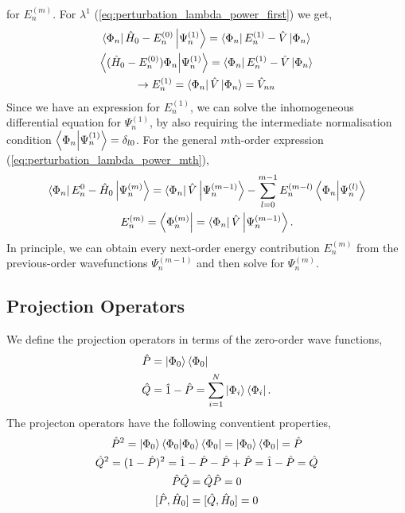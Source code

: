 for $E_n^{(m)}$. 
For $\lambda^1$ (\autoref{eq:perturbation_lambda_power_first}) we get,
\begin{equation}
    \begin{gathered}
    \bra{\Phi_n} \hat{H}_0 - E_n^{(0)}\ket{\Psi_n^{(1)}}
        = \bra{\Phi_n} E_n^{(1)} - \hat{V}\ket{\Phi_n} \\
    \bra{(\hat{H}_0 - E_n^{(0)})\Phi_n} \ket{\Psi_n^{(1)}}
        = \bra{\Phi_n} E_n^{(1)} - \hat{V}\ket{\Phi_n} \\
    \to E_n^{(1)} = \bra{\Phi_n} \hat{V} \ket{\Phi_n} = \hat{V}_{nn}
    \end{gathered}
\end{equation}
Since we have an expression for $E_n^{(1)}$, we can solve the inhomogeneous 
differential equation for $\Psi_n^{(1)}$, by also requiring the intermediate
normalisation condition $\braket{\Phi_n}{\Psi_n^{(1)}} = \delta_{l0}$. For 
the general $m$th-order expression (\autoref{eq:perturbation_lambda_power_mth}),
\begin{equation}
    \begin{gathered}
        \bra{\Phi_n} E_n^{0} - \hat{H}_0\ket{\Psi_n^{(m)}}
            = \bra{\Phi_n} \hat{V} \ket{\Psi_n^{(m-1)}}
            - \sum_{l=0}^{m-1}E_n^{(m-l)}\braket{\Phi_n}{\Psi_n^{(l)}} \\
        E_n^{(m)} = \bra{\Phi_n^{(m)}} = \bra{\Phi_n} \hat{V} \ket{\Psi_n^{(m-1)}}.
    \end{gathered}
\end{equation} 
In principle, we can obtain every next-order energy contribution $E_n^{(m)}$ from 
the previous-order wavefunctions $\Psi_n^{(m-1)}$ and then solve for $\Psi_n^{(m)}$.

\subsection{Projection Operators}
We define the projection operators in terms of the zero-order wave functions,
\begin{equation}
    \begin{aligned}
        \hat{P} &= \ket{\Phi_0} \bra{\Phi_0} \\
        \hat{Q} &= \hat{1} - \hat{P} = \sum_{i=1}^N \ket{\Phi_i} \bra{\Phi_i}.
    \end{aligned}
\end{equation}
The projecton operators have the following conventient properties,
\begin{equation}
    \begin{gathered}
    \hat{P}^2 =  \ket{\Phi_0}\bra{\Phi_0}\ket{\Phi_0}\bra{\Phi_0} 
        = \ket{\Phi_0}\bra{\Phi_0} = \hat{P} \\
    \hat{Q}^2 = (1 - \hat{P})^2 = \hat{1} - \hat{P} - \hat{P} + \hat{P}
        = \hat{1} - \hat{P} = \hat{Q} \\
    \hat{P}\hat{Q} = \hat{Q} \hat{P} = 0 \\
    [ \hat{P}, \hat{H}_0 ] = [ \hat{Q}, \hat{H}_0 ] = 0
    \end{gathered}
\end{equation}


